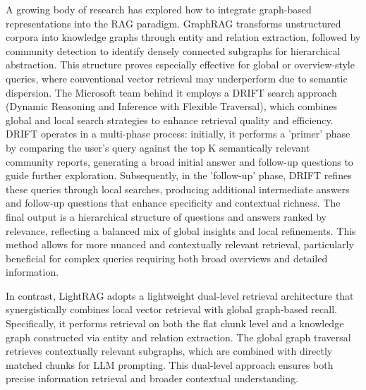 \documentclass[12pt,twoside]{report}
\begin{document}
A growing body of research has explored how to integrate graph-based representations into the RAG paradigm. GraphRAG \cite{GraphRAG} transforms unstructured corpora into knowledge graphs through entity and relation extraction, followed by community detection to identify densely connected subgraphs for hierarchical abstraction. This structure proves especially effective for global or overview-style queries, where conventional vector retrieval may underperform due to semantic dispersion. The Microsoft team behind it employs a DRIFT search approach (Dynamic Reasoning and Inference with Flexible Traversal)\cite{DRIFT}, which combines global and local search strategies to enhance retrieval quality and efficiency. DRIFT operates in a multi-phase process: initially, it performs a 'primer' phase by comparing the user's query against the top K semantically relevant community reports, generating a broad initial answer and follow-up questions to guide further exploration. Subsequently, in the 'follow-up' phase, DRIFT refines these queries through local searches, producing additional intermediate answers and follow-up questions that enhance specificity and contextual richness. The final output is a hierarchical structure of questions and answers ranked by relevance, reflecting a balanced mix of global insights and local refinements. This method allows for more nuanced and contextually relevant retrieval, particularly beneficial for complex queries requiring both broad overviews and detailed information.

In contrast, LightRAG adopts a lightweight dual-level retrieval architecture that synergistically combines local vector retrieval with global graph-based recall. Specifically, it performs retrieval on both the flat chunk level and a knowledge graph constructed via entity and relation extraction. The global graph traversal retrieves contextually relevant subgraphs, which are combined with directly matched chunks for LLM prompting. This dual-level approach ensures both precise information retrieval and broader contextual understanding.
\end{document}
